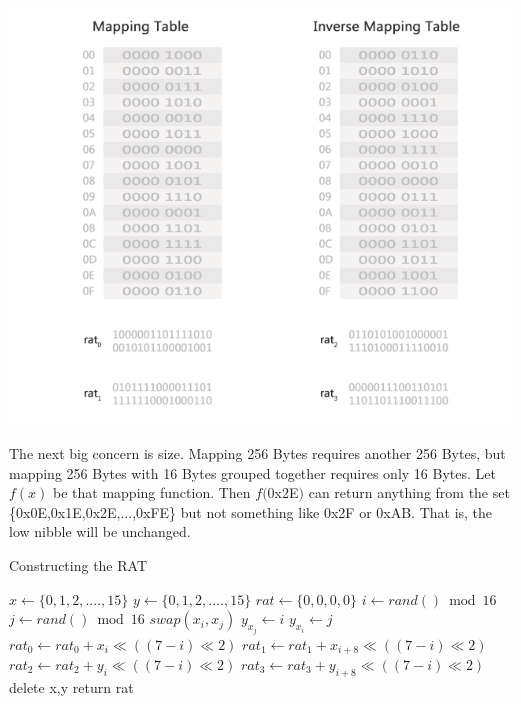 \begin{center}
\includegraphics[scale=0.4,natwidth=640,natheight=530]{psd/after.png}
\end{center}

The next big concern is size. Mapping 256 Bytes requires another 256 Bytes, but mapping 256 Bytes with 16 Bytes grouped together requires only 16 Bytes. Let $f(x)$ be that mapping function. Then $f($0x2E$)$ can return anything from the set \{0x0E,0x1E,0x2E,...,0xFE\} but not something like 0x2F or 0xAB. That is, the low nibble will be unchanged.\\

\begin{algorithm}
	\caption{Constructing the RAT}
	\label{Constructing the RAT}

	\begin{algorithmic}[1]
	
	\State $x\gets \{0,1,2,....,15\}$
	\State $y\gets \{0,1,2,....,15\}$
	\State $rat\gets\{0,0,0,0\}$
		\State $i\gets rand() \bmod 16$
		\State $j\gets rand() \bmod 16$
		\State $swap(x_i,x_j)$
		\State $y_{x_j}\gets i$
		\State $y_{x_i}\gets j$
	\EndFor
		\State $rat_0 \gets rat_0 + x_i\ll((7-i)\ll2)$
		\State $rat_1 \gets rat_1 + x_{i+8}\ll((7-i)\ll2)$
		\State $rat_2 \gets rat_2 + y_i\ll((7-i)\ll2)$
		\State $rat_3 \gets rat_3 + y_{i+8}\ll((7-i)\ll2)$
	\EndFor
	\State delete x,y
	\State return rat
	
	\EndFunction	
	\end{algorithmic}
\end{algorithm}

